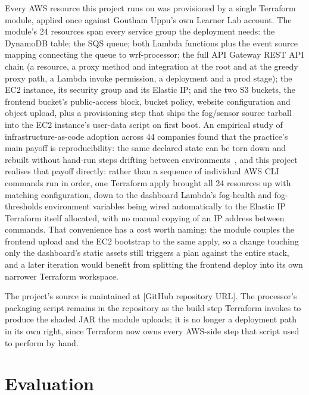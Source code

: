 \documentclass[conference]{IEEEtran}
\begin{document}
Every AWS resource this project runs on was provisioned by a single Terraform module, applied once against Goutham Uppu's own Learner Lab account. The module's 24 resources span every service group the deployment needs: the DynamoDB table; the SQS queue; both Lambda functions plus the event source mapping connecting the queue to wrf-processor; the full API Gateway REST API chain (a resource, a proxy method and integration at the root and at the greedy proxy path, a Lambda invoke permission, a deployment and a prod stage); the EC2 instance, its security group and its Elastic IP; and the two S3 buckets, the frontend bucket's public-access block, bucket policy, website configuration and object upload, plus a provisioning step that ships the fog/sensor source tarball into the EC2 instance's user-data script on first boot. An empirical study of infrastructure-as-code adoption across 44 companies found that the practice's main payoff is reproducibility: the same declared state can be torn down and rebuilt without hand-run steps drifting between environments~\cite{ref8}, and this project realises that payoff directly: rather than a sequence of individual AWS CLI commands run in order, one Terraform apply brought all 24 resources up with matching configuration, down to the dashboard Lambda's fog-health and fog-thresholds environment variables being wired automatically to the Elastic IP Terraform itself allocated, with no manual copying of an IP address between commands. That convenience has a cost worth naming: the module couples the frontend upload and the EC2 bootstrap to the same apply, so a change touching only the dashboard's static assets still triggers a plan against the entire stack, and a later iteration would benefit from splitting the frontend deploy into its own narrower Terraform workspace.

The project's source is maintained at [GitHub repository URL]. The processor's packaging script remains in the repository as the build step Terraform invokes to produce the shaded JAR the module uploads; it is no longer a deployment path in its own right, since Terraform now owns every AWS-side step that script used to perform by hand.

\section{Evaluation}
\end{document}
